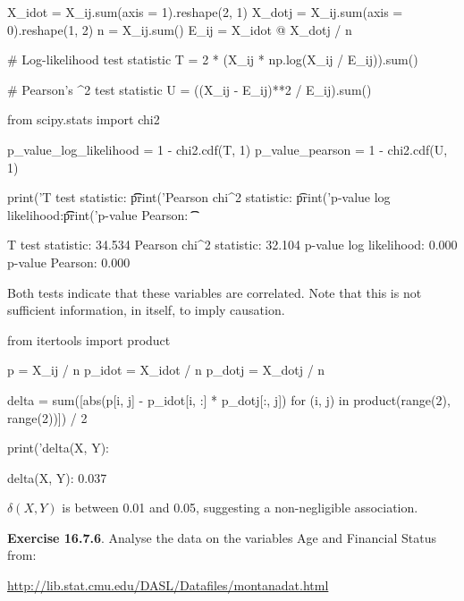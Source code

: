 \begin{python}
X_idot = X_ij.sum(axis = 1).reshape(2, 1)
X_dotj = X_ij.sum(axis = 0).reshape(1, 2)
n = X_ij.sum()
E_ij = X_idot @ X_dotj / n

# Log-likelihood test statistic
T = 2 * (X_ij * np.log(X_ij / E_ij)).sum()

# Pearson's \chi^{2} test statistic
U = ((X_ij - E_ij)**2 / E_ij).sum()
\end{python}

\begin{python}
from scipy.stats import chi2

p_value_log_likelihood = 1 - chi2.cdf(T, 1)
p_value_pearson = 1 - chi2.cdf(U, 1)

print('T test statistic: \t\t%
print('Pearson chi^{2} statistic: \t%

print('p-value log likelihood:\t\t %
print('p-value Pearson: \t\t %
\end{python}

\begin{console}
T test statistic:               34.534
Pearson chi^{2} statistic:        32.104
p-value log likelihood:          0.000
p-value Pearson:                 0.000
\end{console}

Both tests indicate that these variables are correlated. Note that this
is not sufficient information, in itself, to imply causation.

\begin{python}
from itertools import product

p = X_ij / n
p_idot = X_idot / n
p_dotj = X_dotj / n

delta = sum([abs(p[i, j] - p_idot[i, :] * p_dotj[:, j]) 
            for (i, j) in product(range(2), range(2))]) / 2

print('delta(X, Y): %
\end{python}

\begin{console}
delta(X, Y): 0.037
\end{console}

\(\delta(X, Y)\) is between 0.01 and 0.05, suggesting a non-negligible
association.

\textbf{Exercise 16.7.6}. Analyse the data on the variables Age and
Financial Status from:

\url{http://lib.stat.cmu.edu/DASL/Datafiles/montanadat.html}

